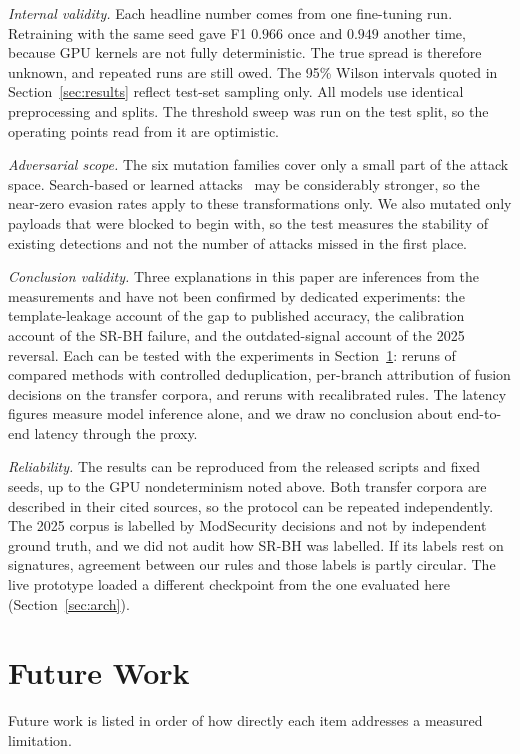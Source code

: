 \documentclass[preprint,11pt]{elsarticle}
\begin{document}
\emph{Internal validity.} Each headline number comes from one fine-tuning
run. Retraining with the same seed gave F1 $0.966$ once and $0.949$ another
time, because GPU kernels are not fully deterministic. The true spread is
therefore unknown, and repeated runs are still owed. The 95\% Wilson
intervals quoted in Section~\ref{sec:results} reflect test-set sampling
only. All models use identical preprocessing and splits. The threshold
sweep was run on the test split, so the operating points read from it are
optimistic.

\emph{Adversarial scope.} The six mutation families cover only a small part
of the attack space. Search-based or learned attacks~\cite{advsqli2024} may
be considerably stronger, so the near-zero evasion rates apply to these
transformations only. We also mutated only payloads that were blocked to
begin with, so the test measures the stability of existing detections and
not the number of attacks missed in the first place.

\emph{Conclusion validity.} Three explanations in this paper are inferences
from the measurements and have not been confirmed by dedicated experiments:
the template-leakage account of the gap to published accuracy, the
calibration account of the SR-BH failure, and the outdated-signal account
of the 2025 reversal. Each can be tested with the experiments in
Section~\ref{sec:future}: reruns of compared methods with controlled
deduplication, per-branch attribution of fusion decisions on the transfer
corpora, and reruns with recalibrated rules. The latency figures measure
model inference alone, and we draw no conclusion about end-to-end latency
through the proxy.

\emph{Reliability.} The results can be reproduced from the released
scripts and fixed seeds, up to the GPU nondeterminism noted above. Both
transfer corpora are described in their cited sources, so the protocol can
be repeated independently. The 2025 corpus is labelled by ModSecurity
decisions and not by independent ground truth, and we did not audit how
SR-BH was labelled. If its labels rest on signatures, agreement between
our rules and those labels is partly circular. The live prototype loaded a
different checkpoint from the one evaluated here (Section~\ref{sec:arch}).


\section{Future Work}
\label{sec:future}
Future work is listed in order of how directly each item addresses a
measured limitation.
\end{document}
